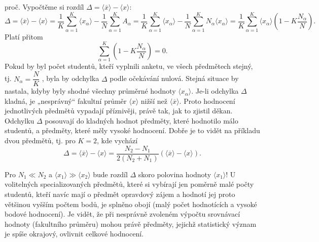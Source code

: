 \begin{example}
  proč. Vypočtěme si rozdíl \(\Delta = \langle \overline{x} \rangle - \langle x \rangle\):
  \begin{equation*}
    \Delta = \langle \overline{x} \rangle - \langle x \rangle 
      = \dfrac{1}{K}\sum_{\alpha=1}^{K}\langle x_\alpha \rangle
      - \dfrac{1}{N}\sum_{\alpha=1}^{K}A_\alpha
      = \dfrac{1}{K}\sum_{\alpha=1}^{K}\langle x_\alpha \rangle
      - \dfrac{1}{N}\sum_{\alpha=1}^{K}N_\alpha\langle x_\alpha \rangle
      = \dfrac{1}{K}\sum_{\alpha=1}^{K}\langle x_\alpha\rangle\left(1 - K\dfrac{N_\alpha}{N}\right).
  \end{equation*}
  Platí přitom
  \begin{equation*}
    \sum_{\alpha=1}^{K}\left(1 - K\dfrac{N_\alpha}{N}\right) = 0.
  \end{equation*}
  Pokud by byl počet studentů, kteří vyplnili anketu, ve všech předmětech stejný, tj. \(N_\alpha = 
  \dfrac{N}{K}\) , byla by odchylka \(\Delta\) podle očekávání nulová. Stejná situace by nastala, 
  kdyby byly shodné všechny průměrné hodnoty \(\langle x_\alpha \rangle\). Je-li odchylka 
  \(\Delta\) kladná, je „nesprávný“ fakultní průměr \(\langle x \rangle\) nižší než \(\langle 
  \overline{x} \rangle\). Proto hodnocení jednotlivých předmětů vypadají příznivěji, právě tak, jak 
  to zjistil děkan. Odchylku \(\Delta\) posouvají do kladných hodnot předměty, které hodnotilo málo 
  studentů, a předměty, které měly vysoké hodnocení. Dobře je to vidět na příkladu dvou předmětů, 
  tj. pro \(K = 2\), kde vychází
  \begin{equation*}
    \Delta = \langle \overline{x} \rangle - \langle x \rangle 
           = \dfrac{N_2 - N_1}{2(N_2+N_1)}\left(\langle\overline{x}\rangle-\langle x\rangle\right).
  \end{equation*}
  
  Pro \(N_1\ll N_2\) a \(\langle x_1 \rangle  \gg \langle x_2 \rangle \) bude rozdíl \(\Delta\) 
  skoro polovina hodnoty \(\langle x_1 \rangle\)! U volitelných specializovaných předmětů, které si 
  vybírají jen poměrně malé počty studentů, kteří navíc mají o předmět opravdový zájem a hodnotí 
  jej proto většinou vyšším počtem bodů, je splněno obojí (malý počet hodnotících a vysoké bodové
  hodnocení). Je vidět, že při nesprávně zvoleném výpočtu srovnávací hodnoty (fakultního průměru) 
  mohou právě předměty, jejichž statistický význam je spíše okrajový, ovlivnit celkové hodnocení.
\normalsize
\end{example}